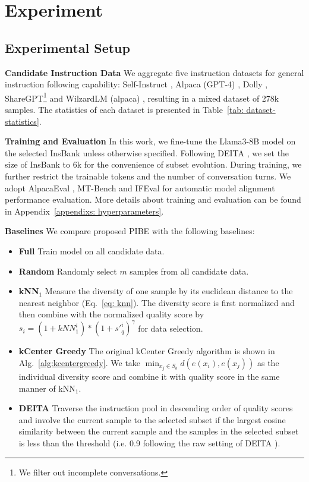\section{Experiment}
\subsection{Experimental Setup}


\textbf{Candidate Instruction Data}  We aggregate five instruction datasets for general instruction following capability: Self-Instruct \citep{collection-self-instruct}, Alpaca (GPT-4) \citep{collection-alpaca-gpt4}, Dolly \citep{collection-dolly}, ShareGPT\footnote{We filter out incomplete conversations.} \citep{collection-sharegpt} and WilzardLM (alpaca) \citep{collection-wizardlm}, resulting in a mixed dataset of 278k samples. The statistics of each dataset is presented in Table~\ref{tab: dataset-statistics}.

\textbf{Training and Evaluation} In this work, we fine-tune the Llama3-8B model \citep{model-llama3} on the selected InsBank unless otherwise specified. Following DEITA \citep{ds-deita}, we set the size of InsBank to 6k for the convenience of subset evolution. During training, we further restrict the trainable tokens and the number of conversation turns. We adopt AlpacaEval \citep{benchmark-alpaca-eval}, MT-Bench \citep{benchmark-mtbench} and IFEval \citep{benchmark-ifeval} for automatic model alignment performance evaluation. More details about training and evaluation can be found in Appendix~\ref{appendixs: hyperparameters}.


\textbf{Baselines} We compare proposed PIBE with the following baselines:
\begin{itemize}[nosep]
    \item \textbf{Full} Train model on all candidate data.
    \item \textbf{Random} Randomly select $m$ samples from all candidate data. 
    \item \textbf{kNN$_1$} Measure the diversity of one sample by its euclidean distance to the nearest neighbor (Eq.~\ref{eq: knn}). The diversity score is first normalized and then combine with the normalized quality score by $s_i = (1+kNN_1^i) * (1+{s'}_q^i)^{\gamma}$ for data selection.
    \item \textbf{kCenter Greedy} \citep{indiv_eval_coreset2} The original kCenter Greedy algorithm is shown in Alg.~\ref{alg:kcentergreedy}. We take $\operatorname*{min}_{x_j\in S_b}d(e(x_i),e(x_j))$ as the individual diversity score and combine it with quality score in the same manner of kNN$_1$.
    \item \textbf{DEITA} Traverse the instruction pool in descending order of quality scores and involve the current sample to the selected subset if the largest cosine similarity between the current sample and the samples in the selected subset is less than the threshold (i.e. 0.9 following the raw setting of DEITA \citep{ds-deita}).
\end{itemize}

